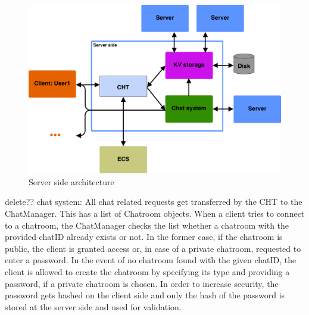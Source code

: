 \begin{figure}[h]
	\centering
	\includegraphics[width=\linewidth]{figures/chat/chat_full_arch.png}
	\caption{Server side architecture}
\end{figure}

delete??
chat system:
All chat related requests get transferred by the CHT to the ChatManager. This has a list of Chatroom objects. When a client tries to connect to a chatroom, the ChatManager checks the list whether a chatroom with the provided chatID already exists or not. In the former case, 
if the chatroom is public, the client is granted access or, in case of a private chatroom, requested to enter a password. In the event of no chatroom found with the given chatID, the client is allowed to create the chatroom by specifying its type and providing a password, if a private chatroom is chosen. In order to increase security, the password gets hashed on the client side and only the hash of the password is stored at the server side and used for validation.